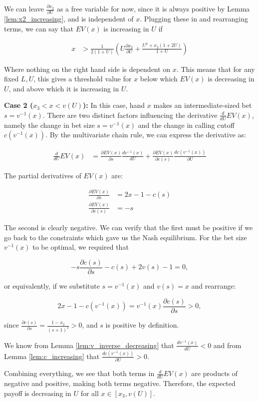 \documentclass[../../main/main.tex]{subfiles}
\begin{document}
\begin{customproof}
    We can leave $\frac{\partial x_2}{\partial U}$ as a free variable for now, since it is always positive by Lemma \ref{lem:x2_increasing}, and is independent of $x$. Plugging these in and rearranging terms, we can say that $EV(x)$ is increasing in $U$ if

    \begin{align*}
        x & > \frac{1}{2(1+U)} \left( U \frac{\partial x_2}{\partial U} + \frac{U^2 + x_2(1 + 2U)}{1+U} \right)
    \end{align*}

    Where nothing on the right hand side is dependent on $x$. This means that for any fixed $L, U$, this gives a threshold value for $x$ below which $EV(x)$ is decreasing in $U$, and above which it is increasing in $U$.

    \textbf{Case 2 ($x_3 < x < v(U)$):} In this case, hand $x$ makes an intermediate-sized bet $s = v^{-1}(x)$. There are two distinct factors influencing the derivative $\frac{d}{dU} EV(x)$, namely the change in bet size $s = v^{-1}(x)$ and the change in calling cutoff $c(v^{-1}(x))$. By the multivariate chain rule, we can express the derivative as:

    \begin{align*}
        \frac{d}{dU} EV(x) & = \frac{\partial EV(x)}{\partial s} \frac{d v^{-1}(x)}{d U} + \frac{\partial EV(x)}{\partial c(s)} \frac{d c(v^{-1}(x))}{\partial U}
    \end{align*}

    The partial derivatives of $EV(x)$ are:

    \begin{align*}
        \frac{\partial EV(x)}{\partial s} & = 2x - 1 - c(s) \\
        \frac{\partial EV(x)}{\partial c(s)} & = - s
    \end{align*}

    The second is clearly negative. We can verify that the first must be positive if we go back to the constraints which gave us the Nash equilibrium. For the bet size $v^{-1}(x)$ to be optimal, we required that

    $$ -s \frac{\partial c(s)}{\partial s} - c(s) + 2v(s) - 1 = 0,$$

    or equivalently, if we substitute $s= v^{-1}(x)$ and $v(s) = x$ and rearrange:

    $$ 2x -1 -c(v^{-1}(x)) = v^{-1}(x) \frac{\partial c(s)}{\partial s} > 0,$$

    since $\frac{\partial c(s)}{\partial s} = \frac{1-x_2}{(s+1)^2} > 0$, and $s$ is positive by definition.

    We know from Lemma \ref{lem:v_inverse_decreasing} that $\frac{d v^{-1}(x)}{d U} < 0$ and from Lemma \ref{lem:c_increasing} that $\frac{d c(v^{-1}(x))}{\partial U} > 0$.

    Combining everything, we see that both terms in $\frac{d}{dU} EV(x)$ are products of negative and positive, making both terms negative. Therefore, the expected payoff is decreasing in $U$ for all $x \in [x_3, v(U)]$.

\end{customproof}
\end{document}
